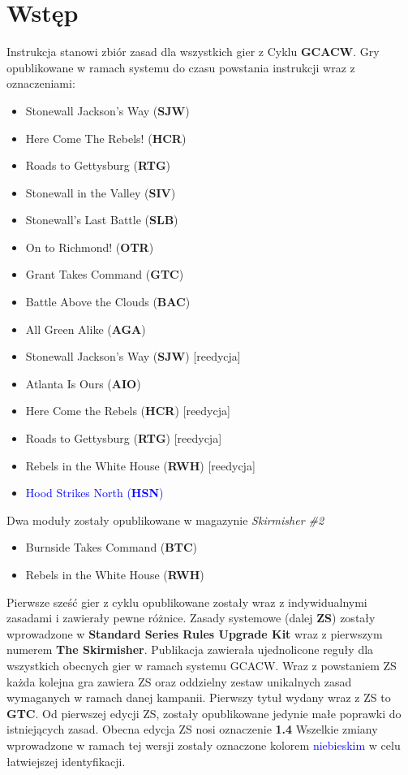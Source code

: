 \section{Wstęp}

Instrukcja stanowi zbiór zasad dla wszystkich gier z Cyklu \textbf{GCACW}. Gry opublikowane w ramach systemu do czasu powstania instrukcji wraz z oznaczeniami:
\begin{itemize}
    \item Stonewall Jackson’s Way (\textbf{SJW})
    \item Here Come The Rebels! (\textbf{HCR})
    \item Roads to Gettysburg (\textbf{RTG})
    \item Stonewall in the Valley (\textbf{SIV})
    \item Stonewall’s Last Battle (\textbf{SLB})
    \item On to Richmond! (\textbf{OTR})
    \item Grant Takes Command (\textbf{GTC})
    \item Battle Above the Clouds (\textbf{BAC})
    \item All Green Alike (\textbf{AGA})
    \item Stonewall Jackson’s Way (\textbf{SJW}) [reedycja]
    \item Atlanta Is Ours (\textbf{AIO})
    \item Here Come the Rebels\! (\textbf{HCR}) [reedycja]
    \item Roads to Gettysburg (\textbf{RTG}) [reedycja]
    \item Rebels in the White House (\textbf{RWH}) [reedycja]
    \item \textcolor{blue}{Hood Strikes North (\textbf{HSN})}

\end{itemize}
Dwa moduły zostały opublikowane w magazynie \textit{Skirmisher \#2}
\begin{itemize}
    \item Burnside Takes Command (\textbf{BTC})
    \item Rebels in the White House (\textbf{RWH})
\end{itemize}
Pierwsze sześć gier z cyklu opublikowane zostały wraz z indywidualnymi zasadami i zawierały pewne różnice. Zasady systemowe (dalej \textbf{ZS}) zostały wprowadzone w \textbf{Standard Series Rules Upgrade Kit} wraz z pierwszym numerem \textbf{The Skirmisher}. Publikacja zawierała ujednolicone reguły dla wszystkich obecnych gier w ramach systemu GCACW. Wraz z powstaniem ZS każda kolejna gra zawiera ZS oraz oddzielny zestaw unikalnych zasad wymaganych w ramach danej kampanii. Pierwszy tytuł wydany wraz z ZS to \textbf{GTC}. Od pierwszej edycji ZS, zostały opublikowane jedynie małe poprawki do istniejących zasad. Obecna edycja ZS nosi oznaczenie \textbf{1.4} Wszelkie zmiany wprowadzone w ramach tej wersji zostały oznaczone kolorem \textcolor{blue}{niebieskim} w celu łatwiejszej identyfikacji.\par
